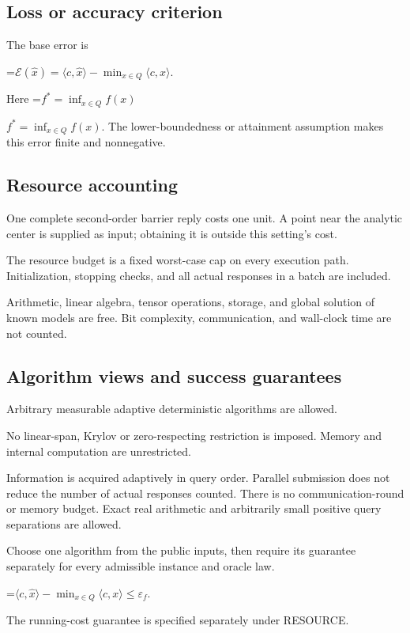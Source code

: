 \documentclass[10pt,a4paper]{article}
\newcommand{\AtlasMath}[1]{\par\begingroup\centering\setbox0=\hbox{$\displaystyle #1$}\ifdim\wd0>1.4\linewidth\typeout{ATLAS WIDE FORMULA: \the\wd0}\fi\ifdim\wd0>\linewidth\resizebox{\linewidth}{!}{\box0}\else\box0\fi\par\endgroup}
\newcommand{\AtlasInlineMath}[1]{\begingroup\setbox0=\hbox{$#1$}\ifdim\wd0>.4\linewidth\endgroup\AtlasMath{#1}\else\endgroup$#1$\fi}
\begin{document}
\subsection{Loss or accuracy criterion}
The base error is


\AtlasMath{\mathcal{E}(\widehat{x})=\langle c,\widehat{x}\rangle-\min_{x\in Q}\langle c,x\rangle.}


Here \AtlasInlineMath{f^*=\inf_{x\in Q}f(x)}. The lower-boundedness or attainment assumption makes this error finite and nonnegative.

\subsection{Resource accounting}
One complete second-order barrier reply costs one unit. A point near the analytic center is supplied as input; obtaining it is outside this setting's cost.

The resource budget is a fixed worst-case cap on every execution path. Initialization, stopping checks, and all actual responses in a batch are included.

Arithmetic, linear algebra, tensor operations, storage, and global solution of known models are free. Bit complexity, communication, and wall-clock time are not counted.

\subsection{Algorithm views and success guarantees}
Arbitrary measurable adaptive deterministic algorithms are allowed.

No linear-span, Krylov or zero-respecting restriction is imposed. Memory and internal computation are unrestricted.

Information is acquired adaptively in query order. Parallel submission does not reduce the number of actual responses counted. There is no communication-round or memory budget. Exact real arithmetic and arbitrarily small positive query separations are allowed.

Choose one algorithm from the public inputs, then require its guarantee separately for every admissible instance and oracle law.


\AtlasMath{\langle c,\widehat{x}\rangle-\min_{x\in Q}\langle c,x\rangle\le \varepsilon_f.}


The running-cost guarantee is specified separately under RESOURCE.
\end{document}
